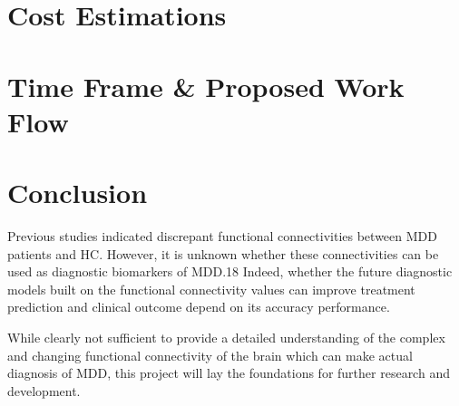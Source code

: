 \documentclass{article}
\begin{document}
\newpage

\section{Cost Estimations}
\section{Time Frame \& Proposed Work Flow}
\section{Conclusion}

Previous studies indicated discrepant functional connectivities
between MDD patients and HC. However, it is unknown whether these
connectivities can be used as diagnostic biomarkers of MDD.18 Indeed,
whether the future diagnostic models built on the functional
connectivity values can improve treatment prediction and clinical
outcome depend on its accuracy performance.

While clearly not sufficient to provide a detailed understanding of
the complex and changing functional connectivity of the brain which
can make actual diagnosis of MDD, this project will lay the
foundations for further research and development.

\newpage

\printbibliography
\end{document}
